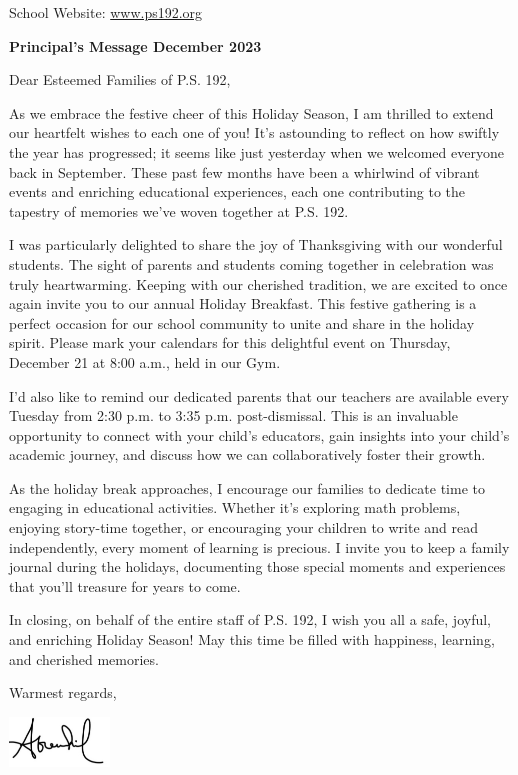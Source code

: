 \documentclass[11pt,letterpaper]{article}
\begin{document}
\vspace*{0.5in}
School Website: \href{https://www.ps192.org/apps/pages/index.jsp?uREC_ID=1504973&type=d&pREC_ID=2359028}{www.ps192.org}

\textbf{Principal's Message December 2023}


Dear Esteemed Families of P.S. 192,

As we embrace the festive cheer of this Holiday Season, I am thrilled to extend our heartfelt wishes to each one of you! It's astounding to reflect on how swiftly the year has progressed; it seems like just yesterday when we welcomed everyone back in September. These past few months have been a whirlwind of vibrant events and enriching educational experiences, each one contributing to the tapestry of memories we've woven together at P.S. 192.

I was particularly delighted to share the joy of Thanksgiving with our wonderful students. The sight of parents and students coming together in celebration was truly heartwarming. Keeping with our cherished tradition, we are excited to once again invite you to our annual Holiday Breakfast. This festive gathering is a perfect occasion for our school community to unite and share in the holiday spirit. Please mark your calendars for this delightful event on Thursday, December 21 at 8:00 a.m., held in our Gym.

I'd also like to remind our dedicated parents that our teachers are available every Tuesday from 2:30 p.m. to 3:35 p.m. post-dismissal. This is an invaluable opportunity to connect with your child’s educators, gain insights into your child's academic journey, and discuss how we can collaboratively foster their growth.

As the holiday break approaches, I encourage our families to dedicate time to engaging in educational activities. Whether it's exploring math problems, enjoying story-time together, or encouraging your children to write and read independently, every moment of learning is precious. I invite you to keep a family journal during the holidays, documenting those special moments and experiences that you'll treasure for years to come.

In closing, on behalf of the entire staff of P.S. 192, I wish you all a safe, joyful, and enriching Holiday Season! May this time be filled with happiness, learning, and cherished memories.

Warmest regards,

\includegraphics[width=0.2\textwidth]{hil_signature}
\end{document}
